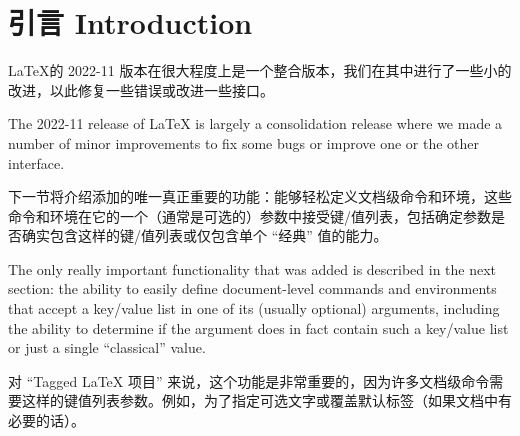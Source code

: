 \documentclass{ltnews}
\makeatletter
\renewcommand{\maketitle}{%
   \twocolumn[{%
      \parbox[t][7\baselineskip]{\textwidth}{%
         \@titlefont\@title\\[\medskipamount]
         \normalfont\normalsize\issuename~\@issue, \@year~年~\@month~月
      }%
   }]%
   \thispagestyle{titlepage}
}
\providecommand\tubcommand[1]{}
\newcommand{\zhquote}[1]{“#1”}
\makeatother
\begin{document}
\tubcommand{\addtolength\textheight{4.2pc}}   %

\maketitle
{  \spaceskip=3.33pt 
\tableofcontents}

\setlength{}

\tubcommand{\addtolength\textheight{4.2pc}}   %

\maketitle
{  \spaceskip=3.33pt 
\tableofcontents}

\setlength{}


\medskip


\section{引言 Introduction}

\LaTeX 的 2022-11 版本在很大程度上是一个整合版本，我们在其中进行了一些小的改进，以此修复一些错误或改进一些接口。

\begin{english}
The 2022-11 release of \LaTeX{} is largely a consolidation release
where we made a number of minor improvements to fix some bugs or
improve one or the other interface.
\end{english}

下一节将介绍添加的唯一真正重要的功能：能够轻松定义文档级命令和环境，这些命令和环境在它的一个（通常是可选的）参数中接受键/值列表，包括确定参数是否确实包含这样的键/值列表或仅包含单个 \zhquote{经典} 值的能力。

\begin{english}
The only really important functionality that was added is described in
the next section: the ability to easily define document-level commands
and environments that accept a key/value list in one of its (usually
optional) arguments, including the ability to determine if the argument
does in fact contain such a key/value list or just a single
\enquote{classical} value.
\end{english}

对 \zhquote{Tagged \LaTeX{} 项目} 来说，这个功能是非常重要的，因为许多文档级命令需要这样的键值列表参数。例如，为了指定可选文字或覆盖默认标签（如果文档中有必要的话）。
\end{document}

